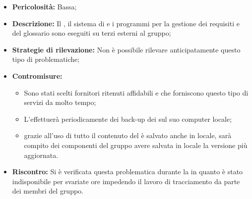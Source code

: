 \label{r_appweb}
\begin{itemize}
\item \textbf{Pericolosità:} Bassa;
\item \textbf{Descrizione:} Il , il sistema di  e i programmi per la gestione dei requisiti e del glossario sono eseguiti su  terzi esterni al gruppo;
\item \textbf{Strategie di rilevazione:} Non è possibile rilevare anticipatamente questo tipo di problematiche;
\item \textbf{Contromisure:}
\begin{itemize}
\item Sono stati scelti fornitori ritenuti affidabili e che forniscono questo tipo di servizi da molto tempo;
\item L'\rAP effettuerà periodicamente dei back-up dei  sul suo computer locale;
\item grazie all'uso di  tutto il contenuto del  è salvato anche in locale, sarà compito dei componenti del gruppo avere salvata in locale la versione più aggiornata.
\end{itemize}
\item \textbf{Riscontro:} Si è verificata questa problematica durante la \fPD in quanto \pragmadb è stato indisponibile per svariate ore impedendo il lavoro di tracciamento da parte dei membri del gruppo.
\end{itemize}
